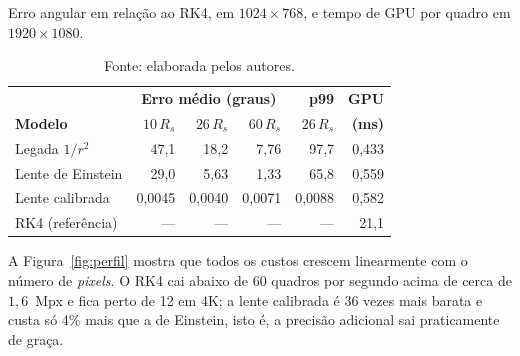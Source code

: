\documentclass[a4paper, 12pt, twoside]{article}
\begin{document}
\begin{table}[!ht]
\caption{Erro angular em relação ao RK4, em $1024\times768$, e tempo de
GPU por quadro em $1920\times1080$.}
\label{tab:resultados}
\centering
\begin{tabular}{lrrrrr}
\toprule
 & \multicolumn{3}{c}{\textbf{Erro médio (graus)}} & \textbf{p99} & \textbf{GPU} \\
\cmidrule(lr){2-4}
\textbf{Modelo} & $10\,R_s$ & $26\,R_s$ & $60\,R_s$ & $26\,R_s$ & \textbf{(ms)} \\
\midrule
Legada $1/r^2$    & 47,1   & 18,2   & 7,76   & 97,7   & 0,433 \\
Lente de Einstein & 29,0   & 5,63   & 1,33   & 65,8   & 0,559 \\
Lente calibrada   & 0,0045 & 0,0040 & 0,0071 & 0,0088 & 0,582 \\
RK4 (referência)  & ---    & ---    & ---    & ---    & 21,1  \\
\bottomrule
\end{tabular}
\caption*{\footnotesize Fonte: elaborada pelos autores.}
\end{table}


A Figura~\ref{fig:perfil} mostra que todos os custos crescem
linearmente com o número de \emph{pixels}. O RK4 cai abaixo de 60
quadros por segundo acima de cerca de $1{,}6$~Mpx e fica perto de 12
em 4K; a lente calibrada é 36 vezes mais barata e custa só 4\% mais que a
de Einstein, isto é, a precisão adicional sai praticamente de graça.
\end{document}
